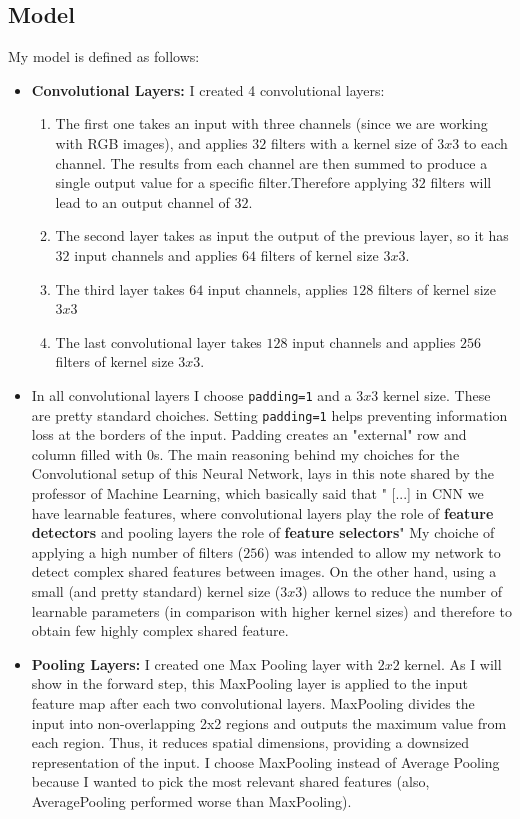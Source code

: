 \documentclass[a4paper]{article}
\begin{document}
\subsection{Model}
My model is defined as follows:
\begin{itemize}
    \item \textbf{Convolutional Layers:} I created 4 convolutional layers:
    \begin{enumerate}
        \item The first one takes an input with three channels (since we are working with RGB images), and applies $32$ filters with a kernel size of $3x3$ to each channel. The results from each channel are then summed to produce a single output value for a specific filter.Therefore applying $32$ filters will lead to an output channel of $32$.
        \item The second layer takes as input the output of the previous layer, so it has $32$ input channels and applies $64$ filters of kernel size $3x3$.
        \item The third layer takes $64$ input channels, applies $128$ filters of kernel size $3x3$
        \item The last convolutional layer takes $128$ input channels and applies $256$ filters of kernel size $3x3$.
    \end{enumerate}
    \item In all convolutional layers I choose \texttt{padding=1} and a $3x3$ kernel size. These are pretty standard choiches. Setting \texttt{padding=1} helps preventing information loss at the borders of the input. Padding creates an "external" row and column filled with $0$s. The main reasoning behind my choiches for the Convolutional setup of this Neural Network, lays in this note shared by the professor of Machine Learning, which basically said that " [...] in CNN we have learnable features, where convolutional layers play the role of \textbf{feature detectors} and pooling layers the role of \textbf{feature selectors}" My choiche of applying a high number of filters ($256$) was intended to allow my network to detect complex shared features between images. On the other hand, using a small (and pretty standard) kernel size ($3x3$) allows to reduce the number of learnable parameters (in comparison with higher kernel sizes) and therefore to obtain few highly complex shared feature. 
    \item \textbf{Pooling Layers:} I created one Max Pooling layer with $2x2$ kernel. As I will show in the forward step, this MaxPooling layer is applied to the input feature map after each two convolutional layers. MaxPooling divides the input into non-overlapping 2x2 regions and outputs the maximum value from each region. Thus, it reduces spatial dimensions, providing a downsized representation of the input. I choose MaxPooling instead of Average Pooling because I wanted to pick the most relevant shared features (also, AveragePooling performed worse than MaxPooling).

\end{itemize}
\end{document}
